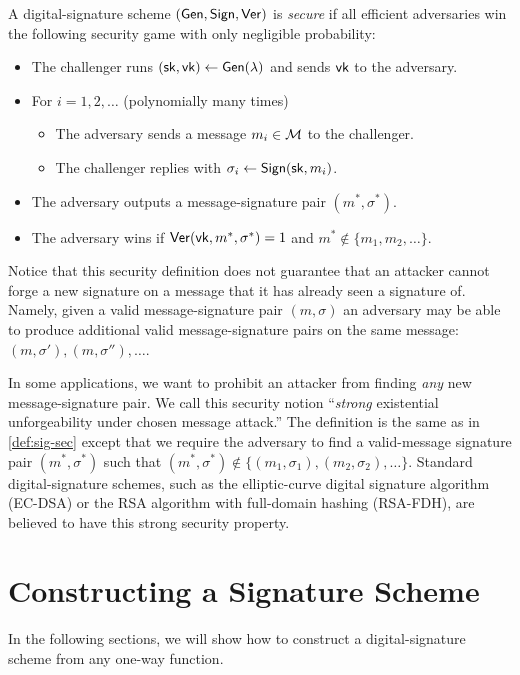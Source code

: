 \begin{definition}\label{def:sig-sec}
  A digital-signature scheme $(\mathsf{Gen}, \mathsf{Sign}, \mathsf{Ver})$ is \emph{secure} if
  all efficient adversaries win the following security 
  game with only negligible probability:
  \begin{itemize}[noitemsep]
    \item The challenger runs $({\mathsf{sk}}, \mathsf{vk}) \gets \mathsf{Gen}(\lambda)$ and sends $\mathsf{vk}$ to the adversary.
    \item For $i = 1, 2, \dots$  (polynomially many times)
      \begin{itemize}
        \item The adversary sends a message $m_i \in \mathcal{M}$ to the challenger.
        \item The challenger replies with $\sigma_i \gets \mathsf{Sign}({\mathsf{sk}}, m_i)$.
      \end{itemize}
    \item The adversary outputs a message-signature pair $(m^*, \sigma^*)$.
    \item The adversary wins if $\mathsf{Ver}(\mathsf{vk}, m^*, \sigma^*) = 1$ and $m^* \not \in \{m_1, m_2, \dots\}$.
  \end{itemize}
\end{definition}

Notice that this   security definition does not guarantee that an attacker cannot forge a new signature on a message that it has already seen a signature of. 
Namely, given a valid
message-signature pair $(m, \sigma)$ an adversary may be able to produce additional valid message-signature
pairs on the same message: $(m, \sigma'), (m, \sigma''), \dots$.

In some applications, we want to prohibit an attacker from finding \emph{any}
new message-signature pair. We call this security notion ``\emph{strong} existential unforgeability under chosen message attack.''  
The definition is the same as in \cref{def:sig-sec} except that we require
the adversary to find a valid-message signature pair $(m^*, \sigma^*)$
such that $(m^*, \sigma^*) \not \in \{ (m_1, \sigma_1), (m_2, \sigma_2), \dots \}$.
Standard digital-signature schemes, such as the elliptic-curve digital signature
algorithm (EC-DSA) or the RSA algorithm with full-domain hashing (RSA-FDH),
are believed to have this strong security property.

\section{Constructing a Signature Scheme}
In the following sections, we will show how to construct a digital-signature
scheme from any one-way function. %

